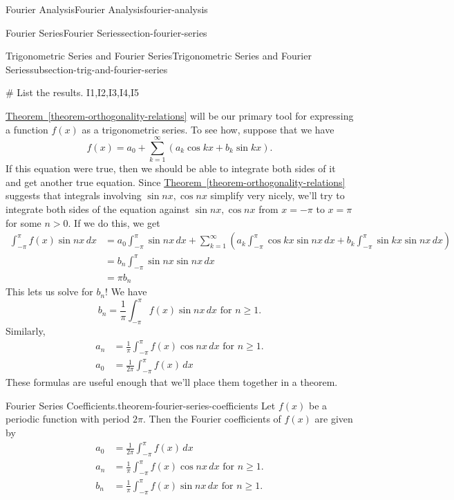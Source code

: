 \documentclass[oneside,10pt,]{book}
\numberwithin{equation}{section}
\newcommand{\amp}{&}
\begin{document}
\begin{chapterptx}{Fourier Analysis}{}{Fourier Analysis}{}{}{fourier-analysis}
\begin{sectionptx}{Fourier Series}{}{Fourier Series}{}{}{section-fourier-series}
\begin{subsectionptx}{Trigonometric Series and Fourier Series}{}{Trigonometric Series and Fourier Series}{}{}{subsection-trig-and-fourier-series}
\begin{sageinput}
# List the results.
I1,I2,I3,I4,I5
\end{sageinput}
\hypertarget{p-581}{}%
\hyperref[theorem-orthogonality-relations]{Theorem~\ref{theorem-orthogonality-relations}} will be our primary tool for expressing a function \(f(x)\) as a trigonometric series. To see how, suppose that we have%
\begin{equation*}
f(x) = a_{0} + \sum_{k=1}^{\infty}(a_{k}\cos kx+b_{k}\sin kx).
\end{equation*}
If this equation were true, then we should be able to integrate both sides of it and get another true equation. Since \hyperref[theorem-orthogonality-relations]{Theorem~\ref{theorem-orthogonality-relations}} suggests that integrals involving \(\sin nx,\cos nx\) simplify very nicely, we'll try to integrate both sides of the equation against \(\sin nx,\cos nx\) from \(x=-\pi\) to \(x=\pi\) for some \(n>0\). If we do this, we get%
\begin{align*}
\int_{-\pi}^{\pi}f(x)\sin nx\,dx \amp = a_{0}\int_{-\pi}^{\pi}\sin nx\,dx + \sum_{k=1}^{\infty}\left(a_{k}\int_{-\pi}^{\pi}\cos kx\sin nx\,dx + b_{k}\int_{-\pi}^{\pi}\sin kx\sin nx\,dx\right)\\
\amp = b_{n}\int_{-\pi}^{\pi}\sin nx \sin nx \,dx\\
\amp = \pi b_{n}
\end{align*}
This lets us solve for \(b_{n}\)! We have%
\begin{equation*}
b_{n} = \frac{1}{\pi}\int_{-\pi}^{\pi}f(x)\sin nx\,dx\text{ for $n\geq 1$.}
\end{equation*}
Similarly,%
\begin{align*}
a_{n} \amp = \frac{1}{\pi}\int_{-\pi}^{\pi}f(x)\cos nx\,dx\text{ for $n\geq1$.}\\
a_{0} \amp = \frac{1}{2\pi}\int_{-\pi}^{\pi}f(x)\,dx
\end{align*}
These formulas are useful enough that we'll place them together in a theorem.%
\begin{theorem}{Fourier Series Coefficients.}{}{theorem-fourier-series-coefficients}%
\hypertarget{p-582}{}%
Let \(f(x)\) be a periodic function with period \(2\pi\). Then the Fourier coefficients of \(f(x)\) are given by%
\begin{align*}
a_{0} \amp= \frac{1}{2\pi}\int_{-\pi}^{\pi}f(x)\,dx\\
a_{n} \amp = \frac{1}{\pi}\int_{-\pi}^{\pi}f(x)\cos nx\,dx\text{ for $n\geq1$.}\\
b_{n} \amp= \frac{1}{\pi}\int_{-\pi}^{\pi}f(x)\sin nx\,dx\text{ for $n\geq 1$.}

\end{align*}
\end{theorem}
\end{subsectionptx}
\end{sectionptx}
\end{chapterptx}
\end{document}
